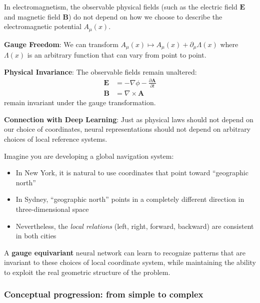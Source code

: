 \begin{example}
In electromagnetism, the observable physical fields (such as the electric field $\mathbf{E}$ and magnetic field $\mathbf{B}$) do not depend on how we choose to describe the electromagnetic potential $A_\mu(x)$.

\textbf{Gauge Freedom}: We can transform $A_\mu(x) \mapsto A_\mu(x) + \partial_\mu \Lambda(x)$ where $\Lambda(x)$ is an arbitrary function that can vary from point to point.

\textbf{Physical Invariance}: The observable fields remain unaltered:
\begin{align}
\mathbf{E} &= -\nabla \phi - \frac{\partial \mathbf{A}}{\partial t} \\
\mathbf{B} &= \nabla \times \mathbf{A}
\end{align}
remain invariant under the gauge transformation.

\textbf{Connection with Deep Learning}: Just as physical laws should not depend on our choice of coordinates, neural representations should not depend on arbitrary choices of local reference systems.
\end{example}

\begin{example}
Imagine you are developing a global navigation system:
\begin{itemize}
    \item In New York, it is natural to use coordinates that point toward ``geographic north''
    \item In Sydney, ``geographic north'' points in a completely different direction in three-dimensional space
    \item Nevertheless, the \textit{local relations} (left, right, forward, backward) are consistent in both cities
\end{itemize}

A \textbf{gauge equivariant} neural network can learn to recognize patterns that are invariant to these choices of local coordinate system, while maintaining the ability to exploit the real geometric structure of the problem.
\end{example}

\subsubsection{Conceptual progression: from simple to complex}

